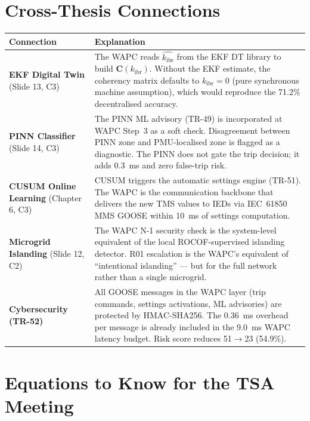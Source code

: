 \documentclass[12pt,a4paper]{article}
\newcommand{\kibr}{k_\mathrm{ibr}}
\begin{document}
\section{Cross-Thesis Connections}

\begin{center}
\begin{tabular}{@{}p{4cm}p{10.5cm}@{}}
\toprule
\textbf{Connection} & \textbf{Explanation} \\
\midrule
\textbf{EKF Digital Twin} \newline (Slide 13, C3) &
The WAPC reads $\hat{\kibr}$ from the EKF DT library to build $\mathbf{C}(\kibr)$. Without the EKF estimate, the coherency matrix defaults to $\kibr = 0$ (pure synchronous machine assumption), which would reproduce the 71.2\% decentralised accuracy. \\
\addlinespace
\textbf{PINN Classifier} \newline (Slide 14, C3) &
The PINN ML advisory (TR-49) is incorporated at WAPC Step~3 as a soft check. Disagreement between PINN zone and PMU-localised zone is flagged as a diagnostic. The PINN does not gate the trip decision; it adds 0.3~ms and zero false-trip risk. \\
\addlinespace
\textbf{CUSUM Online Learning} \newline (Chapter 6, C3) &
CUSUM triggers the automatic settings engine (TR-51). The WAPC is the communication backbone that delivers the new TMS values to IEDs via IEC~61850 MMS GOOSE within 10~ms of settings computation. \\
\addlinespace
\textbf{Microgrid Islanding} \newline (Slide 12, C2) &
The WAPC N-1 security check is the system-level equivalent of the local ROCOF-supervised islanding detector. R01 escalation is the WAPC's equivalent of ``intentional islanding'' — but for the full network rather than a single microgrid. \\
\addlinespace
\textbf{Cybersecurity (TR-52)} &
All GOOSE messages in the WAPC layer (trip commands, settings activations, ML advisories) are protected by HMAC-SHA256. The 0.36~ms overhead per message is already included in the 9.0~ms WAPC latency budget. Risk score reduces 51$\to$23 (54.9\%). \\
\bottomrule
\end{tabular}
\end{center}

\section{Equations to Know for the TSA Meeting}
\end{document}
